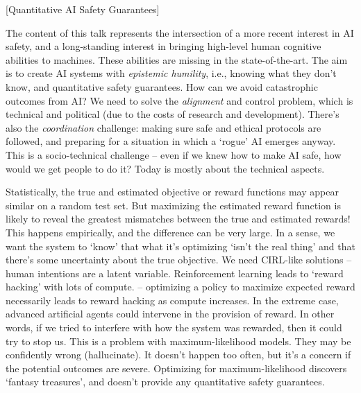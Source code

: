 [Quantitative AI Safety Guarantees]

\begin{affils}
\end{affils}

The content of this talk represents the intersection of a more recent interest in AI
safety, and a long-standing interest in bringing high-level human cognitive abilities
to machines.
These abilities are missing in the state-of-the-art.
The aim is to create AI systems with \emph{epistemic humility}, i.e., knowing what they
don't know, and quantitative safety guarantees.
How can we avoid catastrophic outcomes from AI?
We need to solve the \emph{alignment} and control problem, which is technical and
political (due to the costs of research and development).
There's also the \emph{coordination} challenge: making sure safe and ethical protocols
are followed, and preparing for a situation in which a `rogue' AI emerges anyway.
This is a socio-technical challenge -- even if we knew how to make AI safe, how would
we get people to do it?
Today is mostly about the technical aspects.

Statistically, the true and estimated objective or reward functions may appear similar
on a random test set.
But maximizing the estimated reward function is likely to reveal the greatest
mismatches between the true and estimated rewards!
This happens empirically, and the difference can be very large.
In a sense, we want the system to `know' that what it's optimizing `isn't the real
thing' and that there's some uncertainty about the true objective.
We need CIRL-like solutions -- human intentions are a latent variable.
Reinforcement learning leads to `reward hacking' with lots of compute.
\textcites{Cohen2022} -- optimizing a policy to maximize expected reward necessarily
leads to reward hacking as compute increases.
In the extreme case, advanced artificial agents could intervene in the provision of
reward.
In other words, if we tried to interfere with how the system was rewarded, then it
could try to stop us.
This is a problem with maximum-likelihood models.
They may be confidently wrong (hallucinate).
It doesn't happen too often, but it's a concern if the potential outcomes are severe.
Optimizing for maximum-likelihood discovers `fantasy treasures', and doesn't provide
any quantitative safety guarantees.

